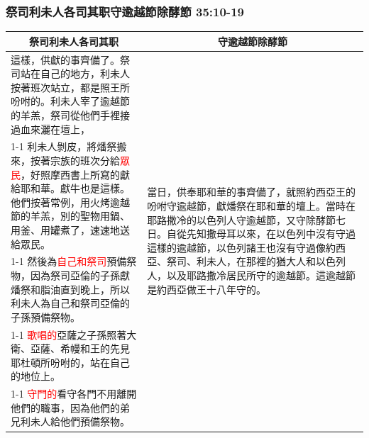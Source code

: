 \subsubsection{祭司利未人各司其职守逾越節除酵節 35:10-19}
\begin{table}[H]
\centering
\begin{tabular}{p{}|p{5.5cm}}\hline\hline
\multicolumn{1}{c|}{祭司利未人各司其职}&\multicolumn{1}{c}{守逾越節除酵節}\\\hline
這樣，供獻的事齊備了。祭司站在自己的地方，利未人按著班次站立，都是照王所吩咐的。利未人宰了逾越節的羊羔，祭司從他們手裡接過血來灑在壇上，
&\multirow{5}{5.6cm}{當日，供奉耶和華的事齊備了，就照約西亞王的吩咐守逾越節，獻燔祭在耶和華的壇上。當時在耶路撒冷的以色列人守逾越節，又守除酵節七日。自從先知撒母耳以來，在以色列中沒有守過這樣的逾越節，以色列諸王也沒有守過像約西亞、祭司、利未人，在那裡的猶大人和以色列人，以及耶路撒冷居民所守的逾越節。這逾越節是約西亞做王十八年守的。}\\\cline{1-1}
利未人剝皮，將燔祭搬來，按著宗族的班次分給\textcolor{red}{眾民}，好照摩西書上所寫的獻給耶和華。獻牛也是這樣。他們按著常例，用火烤逾越節的羊羔，別的聖物用鍋、用釜、用罐煮了，速速地送給眾民。&\\\cline{1-1} 
然後為\textcolor{red}{自己和祭司}預備祭物，因為祭司亞倫的子孫獻燔祭和脂油直到晚上，所以利未人為自己和祭司亞倫的子孫預備祭物。&\\\cline{1-1}
\textcolor{red}{歌唱的}亞薩之子孫照著大衛、亞薩、希幔和王的先見耶杜頓所吩咐的，站在自己的地位上。&\\\cline{1-1}
\textcolor{red}{守門的}看守各門不用離開他們的職事，因為他們的弟兄利未人給他們預備祭物。&\\\hline
\end{tabular}
\end{table} 



